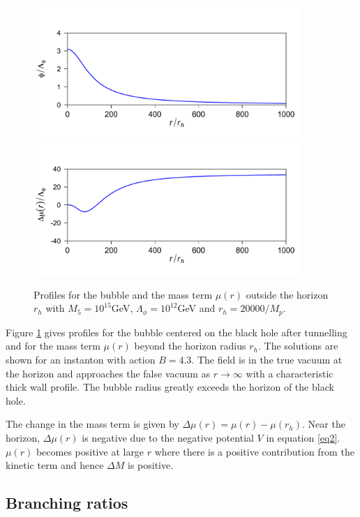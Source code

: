 \documentclass[aps,12pt,prd,superscriptaddress,preprintnumbers, 
	amssymb,
	amsmath,
	notitlepage,
	longbibliography,
	nofootinbib]{revtex4-1}
\begin{document}
\begin{figure}[htb]
\centering
\includegraphics[width=0.9\textwidth]{field.pdf}
\includegraphics[width=0.9\textwidth]{mass.pdf}
\caption{Profiles for the bubble and the mass term $\mu(r)$ outside 
the horizon $r_h$ with $M_5=10^{15}$GeV, $\Lambda_{\phi}=10^{12}$GeV 
and $r_h=20000/M_p$.}
\label{fig:field}
\end{figure}

Figure \ref{fig:field} gives profiles for the bubble centered on the black 
hole after tunnelling and for the mass term $\mu(r)$ beyond the horizon 
radius $r_h$. The solutions are shown for an instanton with action $B=4.3$. 
The field is in the true vacuum at the horizon and approaches the false 
vacuum as $r\to\infty$ with a characteristic thick wall profile. 
The bubble radius greatly exceeds the horizon of the black hole.

The change in the mass term is given by $\Delta\mu(r)=\mu(r)-\mu(r_h)$. 
Near the horizon, $\Delta \mu(r)$ is negative due to the negative potential 
$V$ in equation \ref{eq2}. 
$\mu(r)$ becomes positive at large $r$ where there is a positive contribution 
from the kinetic term and hence $\Delta M$ is positive.


\subsection{Branching ratios}
\end{document}
